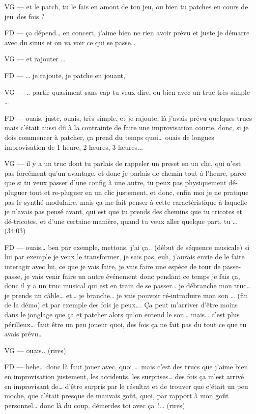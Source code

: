 VG —  et le patch, tu le fais en amont de ton jeu, ou bien tu patches en cours de jeu des fois ? 

FD —  ça dépend… en concert, j'aime bien ne rien avoir prévu et juste je démarre avec du sinus et on va voir ce qui se passe… 

VG —  et rajouter … 

FD —  … je rajoute, je patche en jouant,  

VG —  .. partir quasiment sans cap tu veux dire, ou bien avec un truc très simple … 

FD —  ouais, juste, ouais, très simple, et je rajoute, là  j'avais prévu quelques trucs mais c'était aussi dû à la contrainte de faire une improvisation courte, donc, si je dois commencer à patcher, ça prend du temps quoi… ouais de longues improvisation de 1 heure, 2 heures, 3 heures... 

VG —  il y a un truc dont tu parlais de rappeler un preset en un clic, qui n'est pas forcément qu'un avantage, et donc je parlais de chemin tout à l'heure, parce que si tu veux passer d'une config à une autre, tu peux pas physiquement dé-pluguer tout et re-pluguer en un clic justement, et donc, enfin moi je ne pratique pas le synthé modulaire, mais ça me fait penser à cette caractéristique à laquelle je n'avais pas pensé avant, qui est que tu prends des chemins que tu tricotes et dé-tricotes, et d'une certaine manière, quand tu veux aller quelque part, tu … (34:03) 

FD —  ouais… ben par exemple, mettons, j'ai ça.. (début de séquence musicale) si lui par exemple je veux le transformer, je sais pas, euh, j'aurais envie de le faire interagir avec lui, ce que je vais faire, je vais faire une espèce de tour de passe-passe, je vais venir faire un autre événement donc pendant ce temps je fais ça, donc il y a un truc musical qui est en train de se passer… je débranche mon truc… je prends un câble… et… je branche… je vais pouvoir ré-introduire mon son … (fin de la démo) et par exemple des fois je peux…. Ça peut m'arriver d'être moins dans le jonglage que ça et patcher alors qu'on entend le son… mais… c'est plus périlleux… faut être un peu joueur quoi, des fois ça ne fait pas du tout ce que tu avais prévu… 

VG —  ouais.. (rires) 

FD —  hehe… donc là faut jouer avec, quoi … mais c'est des trucs que j'aime bien en improvisation justement, les accidents, les surprises… des fois ça m'est arrivé en improvisant de… d'être surpris par le résultat et de trouver que c'était un peu moche, que c'était presque de mauvais goût, quoi, par rapport à mon goût personnel… donc là du coup, démerdes toi avec ça !… (rires) 

